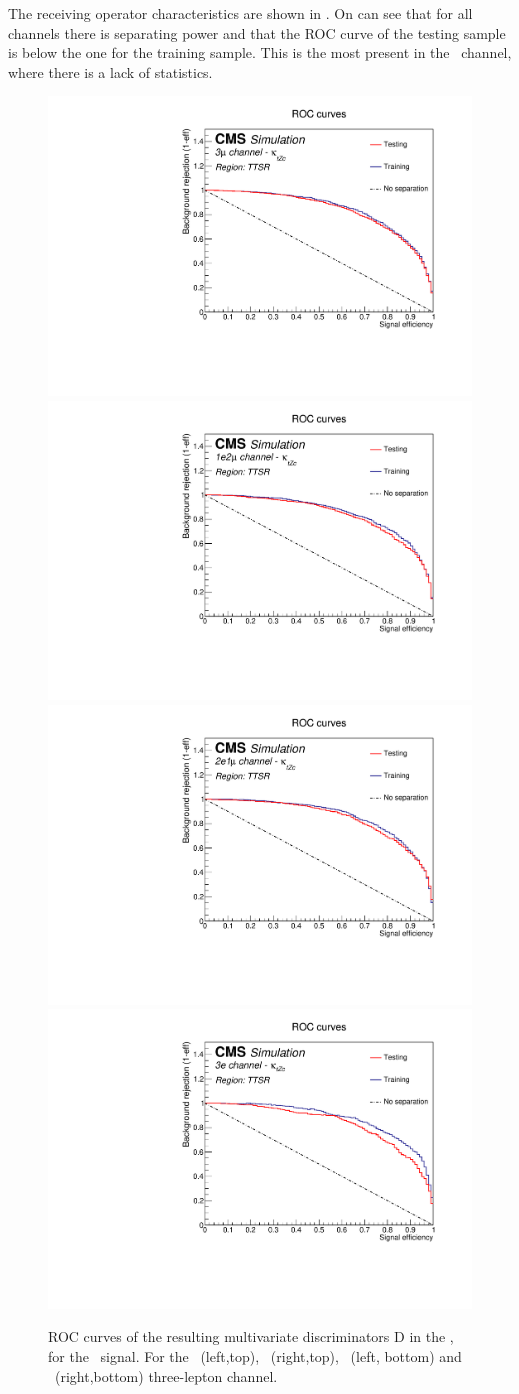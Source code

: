 The receiving operator characteristics are shown in . On can see that for all channels there is separating power and that the ROC curve of the testing sample is below the one for the training sample. This is the most present in the \eee\ channel, where there is a lack of statistics. 
\begin{figure}[htbp]
	\centering
	\includegraphics[width=0.49\linewidth]{6_Search/Figures/PlotsTechnics/ROCZcttoppairuuu}
	\includegraphics[width=0.49\linewidth]{6_Search/Figures/PlotsTechnics/ROCZcttoppairuue}
	\includegraphics[width=0.49\linewidth]{6_Search/Figures/PlotsTechnics/ROCZcttoppaireeu}
	\includegraphics[width=0.49\linewidth]{6_Search/Figures/PlotsTechnics/ROCZcttoppaireee}
	\caption{ROC curves of the resulting  multivariate discriminators D in the \TTSR, for the \Zut\ signal. For the \mumumu\ (left,top), \emumu\ (right,top), \eemu\ (left, bottom) and \eee\ (right,bottom) three-lepton channel.}
	\label{fig:roczcttoppair}
\end{figure}

